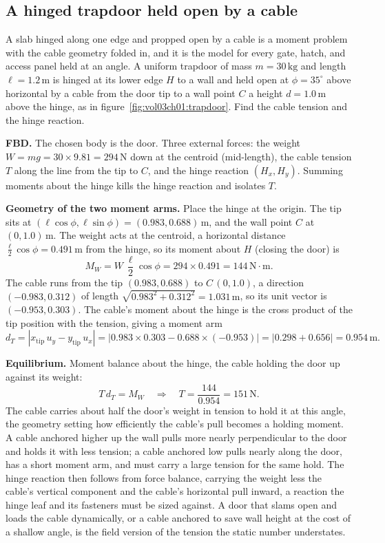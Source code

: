 \subsection{A hinged trapdoor held open by a cable}



A slab hinged along one edge and propped open by a cable is a moment problem
with the cable geometry folded in, and it is the model for every gate, hatch,
and access panel held at an angle. A uniform trapdoor of mass $m = 30\,\si{
\kilogram}$ and length $\ell = 1.2\,\si{\meter}$ is hinged at its lower edge
$H$ to a wall and held open at $\phi = 35^{\circ}$ above horizontal by a cable
from the door tip to a wall point $C$ a height $d = 1.0\,\si{\meter}$ above the
hinge, as in figure~\ref{fig:vol03ch01:trapdoor}. Find the cable tension and
the hinge reaction.

\textbf{FBD.} The chosen body is the door. Three external forces: the weight
$W = mg = 30 \times 9.81 = 294\,\text{N}$ down at the centroid (mid-length),
the cable tension $T$ along the line from the tip to $C$, and the hinge
reaction $(H_x, H_y)$. Summing moments about the hinge kills the hinge reaction
and isolates $T$.

\textbf{Geometry of the two moment arms.} Place the hinge at the origin. The
tip sits at $(\ell\cos\phi, \ell\sin\phi) = (0.983, 0.688)\,\si{\meter}$, and
the wall point $C$ at $(0, 1.0)\,\si{\meter}$. The weight acts at the centroid,
a horizontal distance $\tfrac{\ell}{2}\cos\phi = 0.491\,\si{\meter}$ from the
hinge, so its moment about $H$ (closing the door) is
\[
M_W = W\,\frac{\ell}{2}\cos\phi = 294 \times 0.491 = 144\,\text{N}\cdot\text{m}.
\]
The cable runs from the tip $(0.983, 0.688)$ to $C\,(0, 1.0)$, a direction
$(-0.983, 0.312)$ of length $\sqrt{0.983^2 + 0.312^2} = 1.031\,\si{\meter}$, so
its unit vector is $(-0.953, 0.303)$. The cable's moment about the hinge is the
cross product of the tip position with the tension, giving a moment arm
\[
d_T = |x_{\text{tip}}\,u_y - y_{\text{tip}}\,u_x|
= |0.983 \times 0.303 - 0.688 \times (-0.953)| = |0.298 + 0.656| = 0.954\,\si{\meter}.
\]

\textbf{Equilibrium.} Moment balance about the hinge, the cable holding the
door up against its weight:
\[
T\,d_T = M_W
\quad\Longrightarrow\quad
T = \frac{144}{0.954} = 151\,\text{N}.
\]
The cable carries about half the door's weight in tension to hold it at this
angle, the geometry setting how efficiently the cable's pull becomes a holding
moment. A cable anchored higher up the wall pulls more nearly perpendicular to
the door and holds it with less tension; a cable anchored low pulls nearly
along the door, has a short moment arm, and must carry a large tension for the
same hold. The hinge reaction then follows from force balance, carrying the
weight less the cable's vertical component and the cable's horizontal pull
inward, a reaction the hinge leaf and its fasteners must be sized against. A
door that slams open and loads the cable dynamically, or a cable anchored to
save wall height at the cost of a shallow angle, is the field version of the
tension the static number understates.

